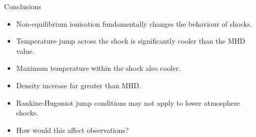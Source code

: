 \documentclass[10pt,aspectratio=169,usenames,dvipsnames]{beamer}
\begin{document}
\begin{frame}{Conclusions}
\begin{itemize}
    \item Non-equilibrium ionisation fundamentally changes the behaviour of shocks.
    \item Temperature jump across the shock is significantly cooler than the MHD value.
    \item Maximum temperature within the shock also cooler.
    \item Density increase far greater than MHD.
    \item Rankine-Hugoniot jump conditions may not apply to lower atmosphere shocks.
    \item How would this affect observations?
\end{itemize}
\end{frame}

\end{document}
